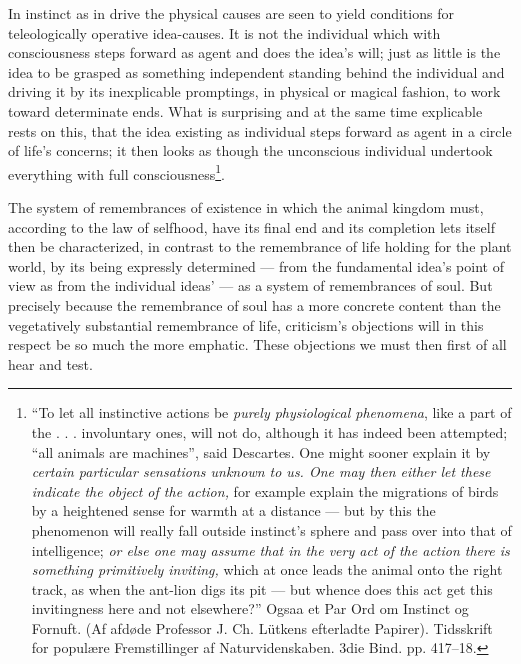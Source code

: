 \documentclass[12pt,a4paper]{book}
\begin{document}
In instinct as in drive the physical causes are seen to yield conditions for
teleologically operative idea-causes. It is not the individual which with consciousness
steps forward as agent and does the idea's will; just as little is the idea to be
grasped as something independent standing behind the individual and driving it by its
inexplicable promptings, in physical or magical fashion, to work toward determinate
ends. What is surprising and at the same time explicable rests on this, that the idea
existing as individual steps forward as agent in a circle of life's concerns; it then
looks as though the unconscious individual undertook everything with full
consciousness\footnote{``To let all instinctive actions be \emph{purely physiological
phenomena}, like a part of the . . . involuntary ones, will not do, although it has
indeed been attempted; ``all animals are machines'', said Descartes. One might sooner
explain it by \emph{certain particular sensations unknown to us. One may then either
let these indicate the object of the action,} for example explain the migrations of
birds by a heightened sense for warmth at a distance --- but by this the phenomenon
will really fall outside instinct's sphere and pass over into that of intelligence;
\emph{or else one may assume that in the very act of the action there is something
primitively inviting,} which at once leads the animal onto the right track, as when the
ant-lion digs its pit --- but whence does this act get this invitingness here and not
elsewhere?'' Ogsaa et Par Ord om Instinct og Fornuft. (Af afdøde Professor
J. Ch. Lütkens efterladte Papirer). Tidsskrift for populære Fremstillinger af
Naturvidenskaben. 3die Bind. pp. 417--18.}.

The system of remembrances of existence in which the animal kingdom must, according to
the law of selfhood, have its final end and its completion lets itself then be
characterized, in contrast to the remembrance of life holding for the plant world, by
its being expressly determined --- from the fundamental idea's point of view as from
the individual ideas' --- as a system of remembrances of soul. But precisely because
the remembrance of soul has a more concrete content than the vegetatively substantial
remembrance of life, criticism's objections will in this respect be so much the more
emphatic. These objections we must then first of all hear and test.
\end{document}
